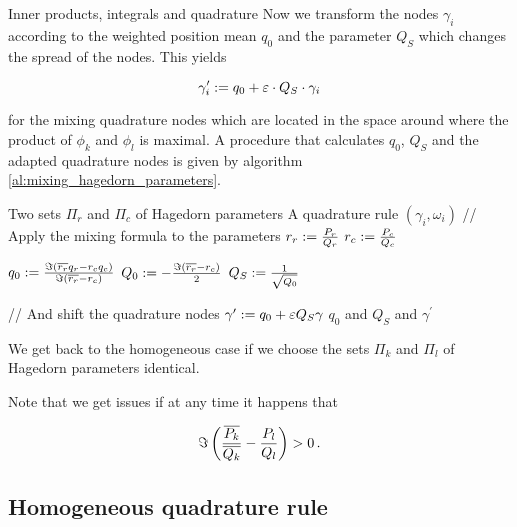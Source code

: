 \begin{chapter}{Inner products, integrals and quadrature}
Now we transform the nodes $\gamma_i$ according to the weighted position mean $q_0$
and the parameter $Q_S$ which changes the spread of the nodes. This yields

\begin{equation} \label{eq:inhomog_transformed_nodes}
  \gamma^{\prime}_i := q_0 + \varepsilon \cdot Q_S \cdot \gamma_i
\end{equation}

for the mixing quadrature nodes which are located in the space around where
the product of $\phi_k$ and $\phi_l$ is maximal. A procedure that calculates
$q_0$, $Q_S$ and the adapted quadrature nodes is given by algorithm \ref{al:mixing_hagedorn_parameters}.

\begin{algorithm}
\caption{Mixing two sets $\Pi_r$ and $\Pi_c$ of Hagedorn parameters}
\label{al:mixing_hagedorn_parameters}
\begin{algorithmic}
  \REQUIRE Two sets $\Pi_r$ and $\Pi_c$ of Hagedorn parameters
  \REQUIRE A quadrature rule $\left(\gamma_i, \omega_i\right)$
  \STATE // Apply the mixing formula to the parameters
  \STATE $r_r := \frac{P_r}{Q_r}$
  \STATE $r_c := \frac{P_c}{Q_c}$

  \STATE $q_0 := \frac{\Im \left(\overline{r_r}q_r-r_c q_c\right)}{\Im \left(\overline{r_r}-r_c\right)}$
  \STATE $Q_0 := -\frac{\Im \left(\overline{r_r}-r_c\right)}{2}$
  \STATE $Q_S := \frac{1}{\sqrt{Q_0}}$

  \STATE // And shift the quadrature nodes
  \STATE $\gamma^\prime := q_0 + \varepsilon Q_S \gamma$
  \RETURN $q_0$ and $Q_S$ and $\gamma^\prime$
\end{algorithmic}
\end{algorithm}

We get back to the homogeneous case if we choose the sets $\Pi_k$ and
$\Pi_l$ of Hagedorn parameters identical.

Note that we get issues if at any time it happens that

\begin{equation}
  \Im \left(\frac{\overline{P_k}}{\overline{Q_k}} -\frac{P_l}{Q_l}\right) > 0 \,.
\end{equation}


\subsection{Homogeneous quadrature rule}


\end{chapter}
